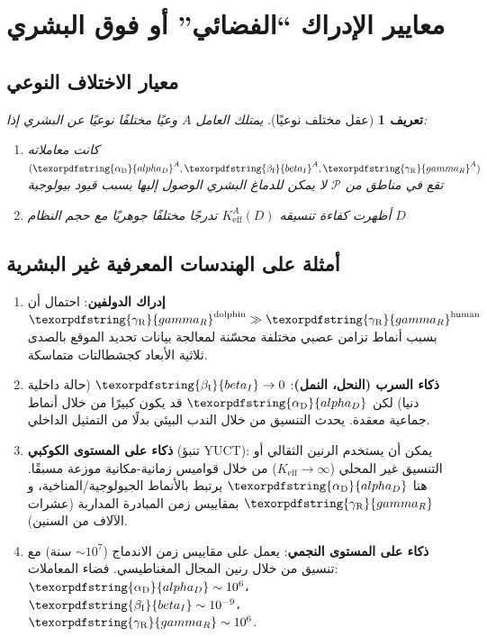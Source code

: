 \documentclass[12pt,a4paper]{article}
\newtheorem{definition}{تعريف}
\DeclareRobustCommand{\alD}{\texorpdfstring{\ensuremath{\alpha_{\mathrm{D}}}}{alpha_D}}
\DeclareRobustCommand{\beI}{\texorpdfstring{\ensuremath{\beta_{\mathrm{I}}}}{beta_I}}
\DeclareRobustCommand{\gaR}{\texorpdfstring{\ensuremath{\gamma_{\mathrm{R}}}}{gamma_R}}
\newcommand{\eff}{\mathrm{eff}}
\newcommand{\Ke}{K_{\eff}}
\begin{document}
	\section{معايير الإدراك ``الفضائي'' أو فوق البشري}
	
	\subsection{معيار الاختلاف النوعي}
	
	\begin{definition}[عقل مختلف نوعيًا]
		يمتلك العامل \(A\) وعيًا مختلفًا نوعيًا عن البشري إذا:
		\begin{enumerate}
			\item كانت معاملاته \((\alD^A, \beI^A, \gaR^A)\) تقع في مناطق من \(\mathcal{P}\) لا يمكن للدماغ البشري الوصول إليها بسبب قيود بيولوجية
			\item أظهرت كفاءة تنسيقه \(\Ke^A(D)\) تدرجًا مختلفًا جوهريًا مع حجم النظام \(D\)
		\end{enumerate}
	\end{definition}
	
	\subsection{أمثلة على الهندسات المعرفية غير البشرية}
	
	\begin{enumerate}
		\item \textbf{إدراك الدولفين}: احتمال أن \(\gaR^{\mathrm{dolphin}} \gg \gaR^{\mathrm{human}}\) بسبب أنماط تزامن عصبي مختلفة محسّنة لمعالجة بيانات تحديد الموقع بالصدى ثلاثية الأبعاد كجشطالتات متماسكة.
		
		\item \textbf{ذكاء السرب (النحل، النمل)}: \(\beI \to 0\) (حالة داخلية دنيا) لكن \(\alD\) قد يكون كبيرًا من خلال أنماط جماعية معقدة. يحدث التنسيق من خلال الندب البيئي بدلًا من التمثيل الداخلي.
		
		\item \textbf{ذكاء على المستوى الكوكبي} (تنبؤ YUCT): يمكن أن يستخدم الرنين الثقالي أو التنسيق غير المحلي (\(\Ke \to \infty\)) من خلال قواميس زمانية-مكانية موزعة مسبقًا. هنا \(\alD\) يرتبط بالأنماط الجيولوجية/المناخية، و\(\gaR\) بمقاييس زمن المبادرة المدارية (عشرات الآلاف من السنين).
		
		\item \textbf{ذكاء على المستوى النجمي}: يعمل على مقاييس زمن الاندماج (\(\sim 10^7\) سنة) مع تنسيق من خلال رنين المجال المغناطيسي. فضاء المعاملات: \(\alD \sim 10^6\)، \(\beI \sim 10^{-9}\)، \(\gaR \sim 10^6\).
	\end{enumerate}
	
\end{document}
